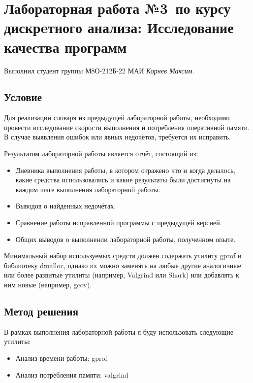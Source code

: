 \documentclass[12pt]{article}
\begin{document}
\section*{Лабораторная работа №3\, по курсу дискрeтного анализа: Исследование качества программ}

Выполнил студент группы М8О-212Б-22 МАИ \textit{Корнев Максим}.

\subsection*{Условие}


Для реализации словаря из предыдущей лабораторной работы, необходимо провести исследование скорости выполнения и потребления оперативной памяти.
В случае выявления ошибок или явных недочётов, требуется их исправить.

Результатом лабораторной работы является отчёт, состоящий из:

\begin{itemize}
    \item Дневника выполнения работы, в котором отражено что и когда делалось, какие средства использовались и какие результаты были достигнуты на каждом шаге выполнения
    лабораторной работы.
    \item Выводов о найденных недочётах.
    \item Сравнение работы исправленной программы с предыдущей версией.
    \item Общих выводов о выполнении лабораторной работы, полученном опыте.
\end{itemize}

Минимальный набор используемых средств должен содержать утилиту gprof и библиотеку dmalloc,
однако их можно заменять на любые другие аналогичные или более развитые утилиты (например, Valgrind или Shark)
или добавлять к ним новые (например, gcov).

\newpage
\subsection*{Метод решения}

В рамках выполнения лабораторной работы я буду использовать следующие утилиты:
\begin{itemize}
    \item Анализ времени работы: gprof
    \item Анализ потребления памяти: valgrind
\end{itemize}
\end{document}
